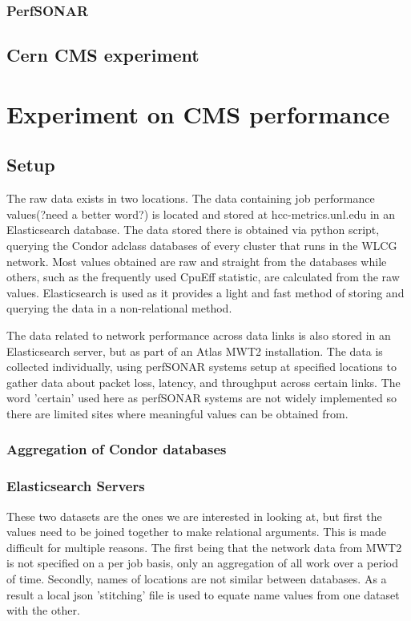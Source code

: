 \documentclass[]{scrartcl}
\begin{document}
\subsubsection{PerfSONAR}
\subsection{Cern CMS experiment}

\section{Experiment on CMS performance}
\subsection{Setup}
The raw data exists in two locations. The data containing job performance values(?need a better word?) is located and stored at hcc-metrics.unl.edu in an Elasticsearch database. The data stored there is obtained via python script, querying the Condor adclass databases of every cluster that runs in the WLCG network. Most values obtained are raw and straight from the databases while others, such as the frequently used CpuEff statistic, are calculated from the raw values. Elasticsearch is used as it provides a light and fast method of storing and querying the data in a non-relational method.

The data related to network performance across data links is also stored in an Elasticsearch server, but as part of an Atlas MWT2 installation. The data is collected individually, using perfSONAR systems setup at specified locations to gather data about packet loss, latency, and throughput across certain links. The word 'certain' used here as perfSONAR systems are not widely implemented so there are limited sites where meaningful values can be obtained from.
\subsubsection{Aggregation of Condor databases}
\subsubsection{Elasticsearch Servers}
These two datasets are the ones we are interested in looking at, but first the values need to be joined together to make relational arguments. This is made difficult for multiple reasons. The first being that the network data from MWT2 is not specified on a per job basis, only an aggregation of all work over a period of time. Secondly, names of locations are not similar between databases. As a result a local json 'stitching' file is used to equate name values from one dataset with the other. 
\end{document}

